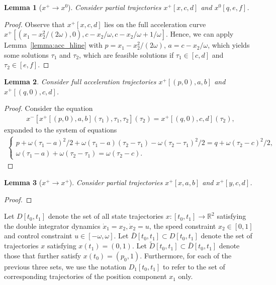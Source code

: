 \documentclass[a4paper]{article}
\theoremstyle{definition}
\theoremstyle{plain}
\newtheorem{lemma}{Lemma}
\begin{document}
\begin{lemma}[$x^{+} \rightarrow x^{0}$]
  Consider partial trajectories $x^{+}[x, c, d]$ and $x^{0}[q, e, f]$.
\end{lemma}
\begin{proof}
  Observe that $x^{+}[x, c, d]$ lies on the full acceleration curve
  $x^{+}[(x_{1} - x_{2}^{2}/(2\omega), 0), c - x_{2}/\omega, c - x_{2}/\omega + 1/\omega]$.
  Hence, we can apply Lemma~\ref{lemma:acc_hline} with
  $p=x_{1} - x_{2}^{2}/(2 \omega)$, $a = c - x_{2}/\omega$, which yields some
  solutions $\tau_{1}$ and $\tau_{2}$, which are feasible solutions if
  $\tau_{1} \in [c, d]$ and $\tau_{2} \in [e, f]$.
\end{proof}

\begin{lemma}
  Consider full acceleration trajectories $x^{+}[(p, 0), a, b]$ and
  $x^{+}[(q, 0), c, d]$.
\end{lemma}
\begin{proof}
  Consider the equation
  \begin{align*}
    x^{-}[x^{+}[(p, 0), a, b](\tau_{1}), \tau_{1}, \tau_{2}](\tau_{2}) = x^{+}[(q, 0), c, d](\tau_{2}) ,
  \end{align*}
  expanded to the system of equations
  \begin{align*}
    \begin{cases}
      p + \omega(\tau_{1} - a)^{2}/2 + \omega(\tau_{1} - a)(\tau_{2} - \tau_{1}) - \omega(\tau_{2} - \tau_{1})^{2}/2 = q + \omega(\tau_{2} - c)^{2}/2 , \\
      \omega(\tau_{1} - a) + \omega(\tau_{2} - \tau_{1}) = \omega(\tau_{2} - c) .
    \end{cases}
  \end{align*}
\end{proof}

\begin{lemma}[$x^{+} \rightarrow x^{+}$]
  Consider partial trajectories $x^{+}[x, a, b]$ and $x^{+}[y, c, d]$.
\end{lemma}
\begin{proof}

\end{proof}

\newpage

Let $D[t_{0}, t_{1}]$ denote the set of all state trajectories
$x : [t_{0}, t_{1}] \rightarrow \mathbb{R}^{2}$ satisfying the double integrator
dynamics $\dot{x}_{1} = x_{2}, \dot{x}_{2} = u$, the speed constraint
$x_{2} \in [0, 1]$ and control constraint $u \in [-\omega, \omega]$.
Let $\bar{D}[t_{0}, t_{1}] \subset D[t_{0}, t_{1}]$ denote the set of
trajectories $x$ satisfying $x(t_{1}) = (0, 1)$. Let
$\widetilde{D}[t_{0}, t_{1}] \subset \bar{D}[t_{0}, t_{1}]$ denote those that
further satisfy $x(t_{0}) = (p_{0}, 1)$.
%
Furthermore, for each of the previous three sets, we use the notation
$D_{1}[t_{0}, t_{1}]$ to refer to the set of corresponding trajectories of the
position component $x_{1}$ only.
\end{document}
